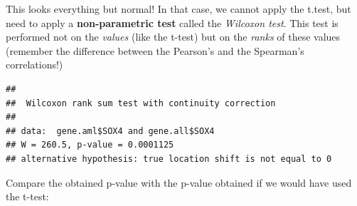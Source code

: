 \documentclass[
]{book}
\newenvironment{Shaded}{\begin{snugshade}}{\end{snugshade}}
\newcommand{\CommentTok}[1]{\textcolor[rgb]{0.56,0.35,0.01}{\textit{#1}}}
\newcommand{\FunctionTok}[1]{\textcolor[rgb]{0.13,0.29,0.53}{\textbf{#1}}}
\newcommand{\NormalTok}[1]{#1}
\newcommand{\OtherTok}[1]{\textcolor[rgb]{0.56,0.35,0.01}{#1}}
\newcommand{\SpecialCharTok}[1]{\textcolor[rgb]{0.81,0.36,0.00}{\textbf{#1}}}
\newcommand{\StringTok}[1]{\textcolor[rgb]{0.31,0.60,0.02}{#1}}
\begin{document}
This looks everything but normal!
In that case, we cannot apply the t.test, but need to apply a \textbf{non-parametric test} called the \emph{Wilcoxon test}.
This test is performed not on the \emph{values} (like the t-test) but on the \emph{ranks} of these values (remember the difference between the Pearson's and the Spearman's correlations!)

\begin{Shaded}
\end{Shaded}

\begin{verbatim}
## 
##  Wilcoxon rank sum test with continuity correction
## 
## data:  gene.aml$SOX4 and gene.all$SOX4
## W = 260.5, p-value = 0.0001125
## alternative hypothesis: true location shift is not equal to 0
\end{verbatim}

Compare the obtained p-value with the p-value obtained if we would have used the t-test:
\end{document}
